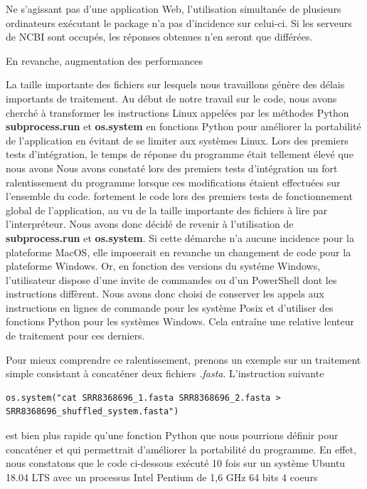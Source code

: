 \documentclass[twoside,a4paper,11pt,frenchb,openany]{report}
\begin{document}
Ne s'agissant pas d'une application Web, l'utilisation simultanée de plusieurs ordinateurs exécutant le package n'a pas d'incidence sur celui-ci. Si les serveurs de NCBI sont occupés, les réponses obtenues n'en seront que différées.

En revanche, augmentation des performances


La taille importante des fichiers sur lesquels nous travaillons génère des délais importants de traitement. Au début de notre travail sur le code, nous avons cherché à transformer les instructions Linux appelées par les méthodes Python \textbf{subprocess.run} et \textbf{os.system} en fonctions Python pour améliorer la portabilité de l'application en évitant de se limiter aux systèmes Linux. Lors des premiers tests d'intégration, le temps de réponse du programme était tellement élevé que nous avons Nous avons constaté lors des premiers tests d'intégration un fort ralentissement du programme lorsque ces modifications étaient effectuées sur l'ensemble du code. fortement le code lors des premiers tests de fonctionnement global de l'application, au vu de la taille importante des fichiers à lire par l'interpréteur. Nous avons donc décidé de revenir à l'utilisation de \textbf{subprocess.run} et \textbf{os.system}. Si cette démarche n'a aucune incidence pour la plateforme MacOS, elle imposerait en revanche un changement de code pour la plateforme Windows. Or, en fonction des versions du systéme Windows, l'utilisateur dispose d'une invite de commandes ou d'un PowerShell dont les instructions diffèrent. Nous avons donc choisi de conserver les appels aux instructions en lignes de commande pour les système Posix et d'utiliser des fonctions Python pour les systèmes Windows. Cela entraîne une relative lenteur de traitement pour ces derniers. 

Pour mieux comprendre ce ralentissement, prenons un exemple sur un traitement simple consistant à concaténer deux fichiers \textit{.fasta}. L'instruction suivante

\begin{verbatim}os.system("cat SRR8368696_1.fasta SRR8368696_2.fasta > SRR8368696_shuffled_system.fasta")\end{verbatim}

est bien plus rapide qu'une fonction Python que nous pourrions définir pour concaténer et qui permettrait d'améliorer la portabilité du programme. En effet, nous constatons que le code ci-dessous exécuté 10 fois sur un système Ubuntu 18.04 LTS avec un processus Intel Pentium de 1,6 GHz 64 bits 4 coeurs
\end{document}
